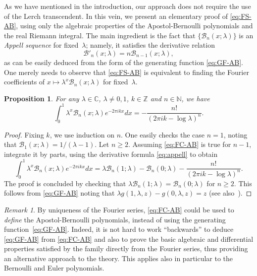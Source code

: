 \documentclass[11pt,a4paper]{amsart}
\newcommand{\N}{\mathbb{N}}
\newcommand{\Z}{\mathbb{Z}}
\newcommand{\C}{\mathbb{C}}
\newcommand{\B}{\mathcal{B}}
\theoremstyle{plain}
\newtheorem{prop}[theorem]{Proposition}
\theoremstyle{remark}
\newtheorem{remark}{Remark}
\begin{document}
As we have mentioned in the introduction, our approach does not require the use of the Lerch transcendent.
In this vein, we present an elementary proof of \eqref{eq:FS-AB}, using only the algebraic properties of the Apostol-Bernoulli polynomials and the real Riemann integral. The main ingredient is the fact that $\{\B_{n}(x;\lambda)\}$ is
an \emph{Appell sequence} for fixed~$\lambda$; namely, it satisfies the derivative relation
%
\begin{equation}
\label{eq:appell}
	\B'_{n}(x;\lambda)=n\B_{n-1}(x;\lambda),
\end{equation}
%
as can be easily deduced from the form of the generating function \eqref{eq:GF-AB}.
One merely needs to observe that \eqref{eq:FS-AB} is equivalent to finding the Fourier coefficients of $x \mapsto \lambda^{x}\B_n(x;\lambda)$ for fixed~$\lambda$. 

\begin{prop}
\label{prop:FC-AB}
For any $\lambda \in \C$, $\lambda \neq 0,1$, $k \in \Z$ and $n \in \N$, we have
%
\begin{equation}
\label{eq:FC-AB}
\int_0^1 \lambda^x\B_{n}(x;\lambda)e^{-2\pi ikx}dx=
-\frac{n!}{(2\pi i k - \log \lambda)^{n}}.
\end{equation}
%
\end{prop}

\begin{proof}
Fixing $k$, we use induction on $n$. One easily checks the case $n=1$, noting that
$\B_1(x;\lambda)=1/(\lambda-1)$. Let $n \geq 2$. Assuming \eqref{eq:FC-AB} is true for $n-1$, integrate it by parts, using the derivative formula \eqref{eq:appell} to
obtain
$$
\int_0^1 \lambda^x\B_{n}(x;\lambda)e^{-2\pi ikx}dx=
\lambda\B_{n}(1;\lambda)-\B_{n}(0;\lambda)-\frac{n!}{(2\pi i k - \log \lambda)^{n}}.
$$
The proof is concluded by checking that $\lambda\B_{n}(1;\lambda) = \B_{n}(0;\lambda)$ for $n \geq 2$. 
This follows from \eqref{eq:GF-AB} noting that $\lambda g(1,\lambda,z) - g(0,\lambda,z) = z$ (see also~\cite[formula 3.5,\,p.~165]{Ap}).
\end{proof}


\begin{remark}
By uniqueness of the Fourier series, \eqref{eq:FC-AB} could be used to \emph{define} the Apostol-Bernoulli polynomials, instead of using the generating function~\eqref{eq:GF-AB}.
Indeed, it is not hard to work ``backwards'' to deduce \eqref{eq:GF-AB} from \eqref{eq:FC-AB}
and also to prove the basic algebraic and differential properties satisfied by the family directly from the Fourier series, thus providing an alternative approach to the theory. This applies also in particular to the Bernoulli and Euler  polynomials.
\end{remark}
\end{document}
